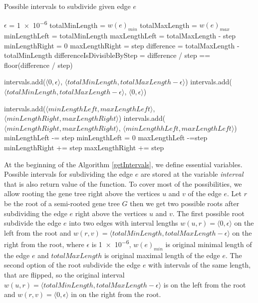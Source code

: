 \begin{algorithm}
\caption{Possible intervals to subdivide given edge $e$} 
\label{getIntervals}
\begin{algorithmic}[1]
	\State $\epsilon$ = \num{1e-6}
	\State totalMinLength = $w(e)_{min}$
	\State totalMaxLength = $w(e)_{max}$
	\State minLengthLeft = totalMinLength
	\State maxLengthLeft = totalMaxLength - step
	\State minLengthRight = 0
	\State maxLengthRight = step
	\State difference = totalMaxLength - totalMinLength
	\State differenceIsDivisibleByStep = difference / step == floor(difference / step)
	
	\State intervals.add($\langle 0, \epsilon \rangle$, $\langle totalMinLength, totalMaxLength-\epsilon \rangle$) 
	\State intervals.add($\langle totalMinLength, totalMaxLength-\epsilon \rangle$, $\langle 0, \epsilon \rangle$)
	
		\State intervals.add($\langle minLengthLeft, maxLengthLeft \rangle$, $\langle minLengthRight, maxLengthRight \rangle$)
			\State intervals.add($\langle minLengthRight, maxLengthRight \rangle$, $\langle minLengthhLeft, maxLengthLeft \rangle$)
		\EndIf
		\State minLengthLeft -= step
			\State minLengthLeft = 0
		\EndIf
		\State maxLengthLeft -=step
		\State minLengthRight += step
		\State maxLengthRight += step
	\EndWhile
\EndFunction
\end{algorithmic}
\end{algorithm}

At the beginning of the Algorithm \ref{getIntervals}, we define essential variables. Possible intervals for subdividing the edge $e$ are stored at the variable \emph{interval} that is also return value of the function. To cover most of the possibilities, we allow rooting the gene tree right above the vertices $u$ and $v$ of the edge $e$. Let $r$ be the root of a semi-rooted gene tree $G$ then we get two possible roots after subdividing the edge $e$ right above the vertices $u$ and $v$. The first possible root subdivide the edge $e$ into two edges with interval lengths $w(u, r) = \langle 0, \epsilon \rangle$ on the left from the root and $w(r, v) = \langle totalMinLength, totalMaxLength-\epsilon \rangle$ on the right from the root, where $\epsilon$ is \num{1e-6}, $w(e)_{min}$ is original minimal length of the edge $e$ and $totalMaxLength$ is original maximal length of the edge $e$. The second option of the root subdivide the edge $e$ with intervals of the same length, that are flipped, so the original interval $w(u, r) = \langle totalMinLength, totalMaxLength-\epsilon \rangle$ is on the left from the root  and $w(r, v) = \langle 0, \epsilon \rangle$ in on the right from the root.

